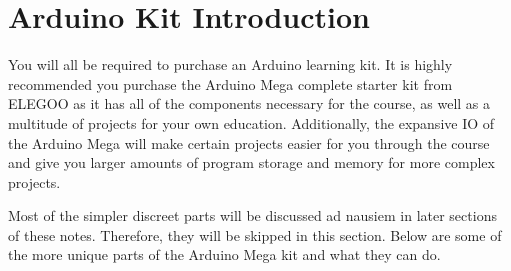 


\pagebreak


\section*{Arduino Kit Introduction}

You will all be required to purchase an Arduino learning kit. 
It is highly recommended you purchase the Arduino Mega complete starter kit from ELEGOO as it has all of the components necessary for the course, as well as a multitude of projects for your own education.
Additionally, the expansive IO of the Arduino Mega will make certain projects easier for you through the course and give you larger amounts of program storage and memory for more complex projects.

Most of the simpler discreet parts will be discussed ad nausiem in later sections of these notes.
Therefore, they will be skipped in this section.
Below are some of the more unique parts of the Arduino Mega kit and what they can do.
    
